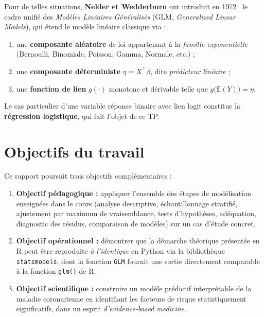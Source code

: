 \documentclass[11pt,a4paper,twoside]{report}
\newcommand{\E}{\mathbb{E}}
\theoremstyle{definition}
\begin{document}
Pour de telles situations, \textbf{Nelder et Wedderburn} ont introduit
en 1972~\cite{nelder} le cadre unifié des \emph{Modèles Linéaires
Généralisés} (GLM, \emph{Generalized Linear Models}), qui étend le
modèle linéaire classique via :

\begin{enumerate}\itemsep0.2em
  \item une \textbf{composante aléatoire} de loi appartenant à la
    \emph{famille exponentielle} (Bernoulli, Binomiale, Poisson, Gamma,
    Normale, etc.) ;
  \item une \textbf{composante déterministe} $\eta = X^\top\beta$, dite
    \emph{prédicteur linéaire} ;
  \item une \textbf{fonction de lien} $g(\cdot)$ monotone et dérivable
    telle que $g\!\big(\E(Y)\big) = \eta$.
\end{enumerate}

Le cas particulier d'une variable réponse binaire avec lien logit
constitue la \textbf{régression logistique}, qui fait l'objet de ce TP.

\section{Objectifs du travail}

Ce rapport poursuit trois objectifs complémentaires :

\begin{enumerate}\itemsep0.3em
  \item \textbf{Objectif pédagogique :} appliquer l'ensemble des étapes
    de modélisation enseignées dans le cours (analyse descriptive,
    échantillonnage stratifié, ajustement par maximum de vraisemblance,
    tests d'hypothèses, adéquation, diagnostic des résidus, comparaison
    de modèles) sur un cas d'étude concret.

  \item \textbf{Objectif opérationnel :} démontrer que la démarche
    théorique présentée en R peut être reproduite \emph{à l'identique} en
    Python via la bibliothèque \texttt{statsmodels}, dont la fonction
    \texttt{GLM} fournit une sortie directement comparable à la fonction
    \texttt{glm()} de R.

  \item \textbf{Objectif scientifique :} construire un modèle prédictif
    interprétable de la maladie coronarienne en identifiant les facteurs
    de risque statistiquement significatifs, dans un esprit
    \emph{d'evidence-based medicine}.
\end{enumerate}
\end{document}

